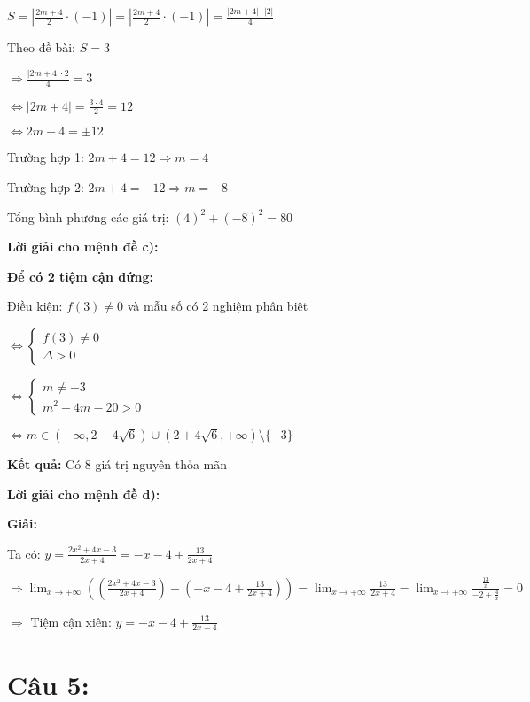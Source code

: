 \documentclass{article}
\begin{document}
\(S = \left| \frac{2m + 4}{2} \cdot (-1) \right| = \left| \frac{2m + 4}{2} \cdot (-1) \right| = \frac{|2m + 4| \cdot |2|}{4}\)

Theo đề bài: \(S = 3\)

\(\Rightarrow \frac{|2m + 4| \cdot 2}{4} = 3\)

\(\Leftrightarrow |2m + 4| = \frac{3 \cdot 4}{2} = 12\)

\(\Leftrightarrow 2m + 4 = \pm 12\)

Trường hợp 1: \(2m + 4 = 12 \Rightarrow m = 4\)

Trường hợp 2: \(2m + 4 = -12 \Rightarrow m = -8\)

Tổng bình phương các giá trị: \((4)^2 + (-8)^2 = 80\)

\textbf{Lời giải cho mệnh đề c):}

\textbf{Để có 2 tiệm cận đứng:}

Điều kiện: \(f(3) \neq 0\) và mẫu số có 2 nghiệm phân biệt

\(\Leftrightarrow \begin{cases}
f(3) \neq 0 \\
\Delta > 0
\end{cases}\)

\(\Leftrightarrow \begin{cases}
m \neq -3 \\
m^2 - 4m - 20 > 0
\end{cases}\)

\(\Leftrightarrow m \in (-\infty, 2 - 4\sqrt{6}) \cup (2 + 4\sqrt{6}, +\infty) \setminus \{-3\}\)

\textbf{Kết quả:} Có \(8\) giá trị nguyên thỏa mãn

\textbf{Lời giải cho mệnh đề d):}

\textbf{Giải:}

Ta có: \(y = \frac{2x^2 + 4x - 3}{2x + 4} = -x - 4 + \frac{13}{2x + 4}\)

\(\Rightarrow \displaystyle\lim_{x \to +\infty} \left(\left(\frac{2x^2 + 4x - 3}{2x + 4}\right) - \left(-x - 4 + \frac{13}{2x + 4}\right)\right) = \displaystyle\lim_{x \to +\infty} \frac{13}{2x + 4} = \displaystyle\lim_{x \to +\infty} \frac{\frac{13}{x}}{-2 + \frac{4}{x}} = 0\)

\(\Rightarrow\) Tiệm cận xiên: \(y = -x - 4 + \frac{13}{2x + 4}\)



\newpage

\section*{Câu 5:}
\end{document}
